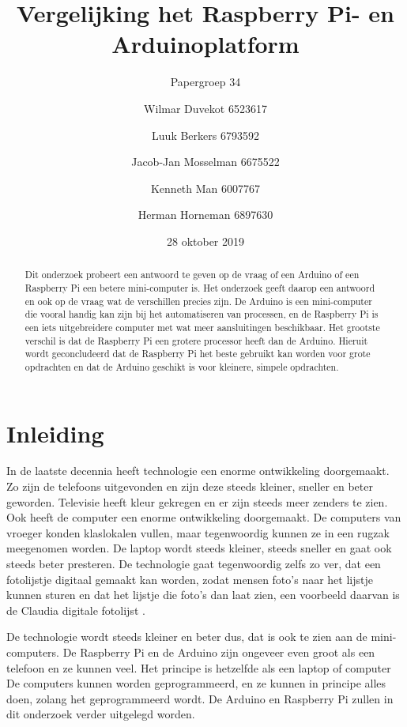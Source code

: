 \documentclass[a4paper, dutch, abstract=true]{scrartcl}
\title{Vergelijking het Raspberry Pi- en Arduinoplatform}
\subtitle{Papergroep 34}
\author{
    Wilmar Duvekot 6523617 \and Luuk Berkers 6793592 \and Jacob-Jan Mosselman
    6675522 \and Kenneth Man 6007767 \and Herman Horneman 6897630
}
\date{28 oktober 2019}
\begin{document}
\maketitle

\begin{abstract}
    Dit onderzoek probeert een antwoord te geven op de vraag of een Arduino of een Raspberry Pi een
    betere mini-computer is.
    Het onderzoek geeft daarop een antwoord en ook op de vraag wat de verschillen precies zijn.
    De Arduino is een mini-computer die vooral handig kan zijn bij het automatiseren van processen,
    en de Raspberry Pi is een iets uitgebreidere computer met wat meer aansluitingen beschikbaar.
    Het grootste verschil is dat de Raspberry Pi een grotere processor heeft dan de Arduino.
    Hieruit wordt geconcludeerd dat de Raspberry Pi het beste gebruikt kan worden voor grote
    opdrachten en dat de Arduino geschikt is voor kleinere, simpele opdrachten.
\end{abstract}

\tableofcontents

\section{Inleiding}
In de laatste decennia heeft technologie een enorme ontwikkeling doorgemaakt.
Zo zijn de telefoons uitgevonden en zijn deze steeds kleiner, sneller en beter geworden.
Televisie heeft kleur gekregen en er zijn steeds meer zenders te zien.
Ook heeft de computer een enorme ontwikkeling doorgemaakt.
De computers van vroeger konden klaslokalen vullen, maar tegenwoordig kunnen ze in een rugzak
meegenomen worden.
De laptop wordt steeds kleiner, steeds sneller en gaat ook steeds beter presteren.
De technologie gaat tegenwoordig zelfs zo ver, dat een fotolijstje digitaal gemaakt kan worden,
zodat mensen foto's naar het lijstje kunnen sturen en dat het lijstje die foto's dan laat zien, een
voorbeeld daarvan is de Claudia digitale fotolijst \cite{innovu2019fotolijst}.

De technologie wordt steeds kleiner en beter dus, dat is ook te zien aan de mini-computers.
De Raspberry Pi \cite{raspberry2019raspberry} en de Arduino \cite{arduino2019arduino} zijn ongeveer
even groot als een telefoon en ze kunnen veel.
Het principe is hetzelfde als een laptop of computer
De computers kunnen worden geprogrammeerd, en ze kunnen in principe alles doen, zolang het
geprogrammeerd wordt.
De Arduino en Raspberry Pi zullen in dit onderzoek verder uitgelegd worden.
\end{document}
